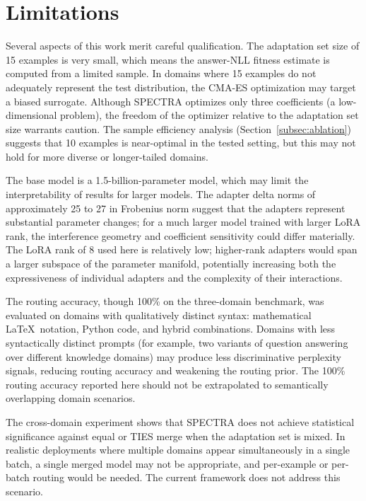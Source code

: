 \documentclass[preprint,12pt]{elsarticle}
\begin{document}
\section{Limitations}
\label{sec:limitations}

Several aspects of this work merit careful qualification. The adaptation set
size of 15 examples is very small, which means the answer-NLL fitness estimate
is computed from a limited sample. In domains where 15 examples do not
adequately represent the test distribution, the CMA-ES optimization may target
a biased surrogate. Although SPECTRA optimizes only three coefficients (a
low-dimensional problem), the freedom of the optimizer relative to the
adaptation set size warrants caution. The sample efficiency analysis
(Section~\ref{subsec:ablation}) suggests that 10 examples is near-optimal in
the tested setting, but this may not hold for more diverse or longer-tailed
domains.

The base model is a 1.5-billion-parameter model, which may limit the
interpretability of results for larger models. The adapter delta norms of
approximately 25 to 27 in Frobenius norm suggest that the adapters represent
substantial parameter changes; for a much larger model trained with larger LoRA
rank, the interference geometry and coefficient sensitivity could differ
materially. The LoRA rank of 8 used here is relatively low; higher-rank adapters
would span a larger subspace of the parameter manifold, potentially increasing
both the expressiveness of individual adapters and the complexity of their
interactions.

The routing accuracy, though 100\% on the three-domain benchmark, was evaluated
on domains with qualitatively distinct syntax: mathematical \LaTeX\ notation,
Python code, and hybrid combinations. Domains with less syntactically distinct
prompts (for example, two variants of question answering over different knowledge
domains) may produce less discriminative perplexity signals, reducing routing
accuracy and weakening the routing prior. The 100\% routing accuracy reported
here should not be extrapolated to semantically overlapping domain scenarios.

The cross-domain experiment shows that SPECTRA does not achieve statistical
significance against equal or TIES merge when the adaptation set is mixed.
In realistic deployments where multiple domains appear simultaneously in a
single batch, a single merged model may not be appropriate, and per-example
or per-batch routing would be needed. The current framework does not address
this scenario.
\end{document}

